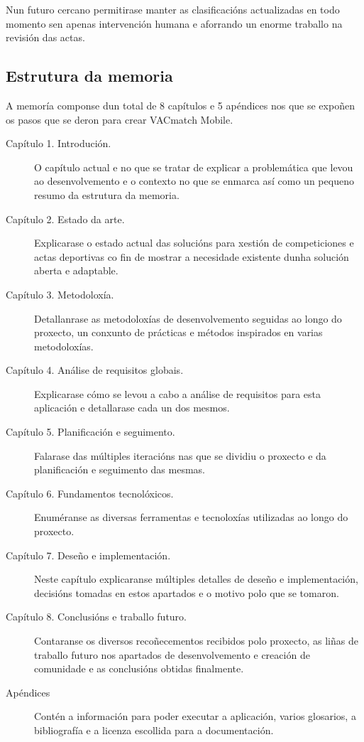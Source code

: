     Nun futuro cercano permitirase manter as clasificacións actualizadas en todo 
momento sen apenas intervención humana e aforrando un enorme traballo na 
revisión das actas.

  \subsection{Estrutura da memoria}
  A memoría componse dun total de 8 capítulos e 5 apéndices nos que se expoñen 
os pasos que se deron para crear VACmatch Mobile.

  \begin{description}
   \item [Capítulo 1. Introdución.] O capítulo actual e no que se tratar de 
explicar a problemática que levou ao desenvolvemento e o contexto no que se 
enmarca así como un pequeno resumo da estrutura da memoria.
   \item [Capítulo 2. Estado da arte.] Explicarase o estado actual das 
solucións para xestión de competiciones e actas deportivas co fin de mostrar a 
necesidade existente dunha solución aberta e adaptable.
   \item [Capítulo 3. Metodoloxía.] Detallanrase as metodoloxías de 
desenvolvemento seguidas ao longo do proxecto, un conxunto de prácticas e 
métodos inspirados en varias metodoloxías.
   \item [Capítulo 4. Análise de requisitos globais.] Explicarase cómo se levou 
a cabo a análise de requisitos para esta aplicación e detallarase cada un dos 
mesmos. 
   \item [Capítulo 5. Planificación e seguimento.] Falarase das múltiples 
iteracións nas que se dividiu o proxecto e da planificación e seguimento das 
mesmas.
   \item [Capítulo 6. Fundamentos tecnolóxicos.] Enuméranse as diversas 
ferramentas e tecnoloxías utilizadas ao longo do proxecto.
   \item [Capítulo 7. Deseño e implementación.] Neste capítulo explicaranse 
múltiples detalles de deseño e implementación, decisións tomadas en estos 
apartados e o motivo polo que se tomaron.
   \item [Capítulo 8. Conclusións e traballo futuro.] Contaranse os diversos 
recoñecementos recibidos polo proxecto, as liñas de traballo futuro nos 
apartados de desenvolvemento e creación de comunidade e as conclusións obtidas 
finalmente. 
   \item [Apéndices] Contén a información para poder executar a aplicación, 
varios glosarios, a bibliografía e a licenza escollida para a documentación.
  \end{description}

